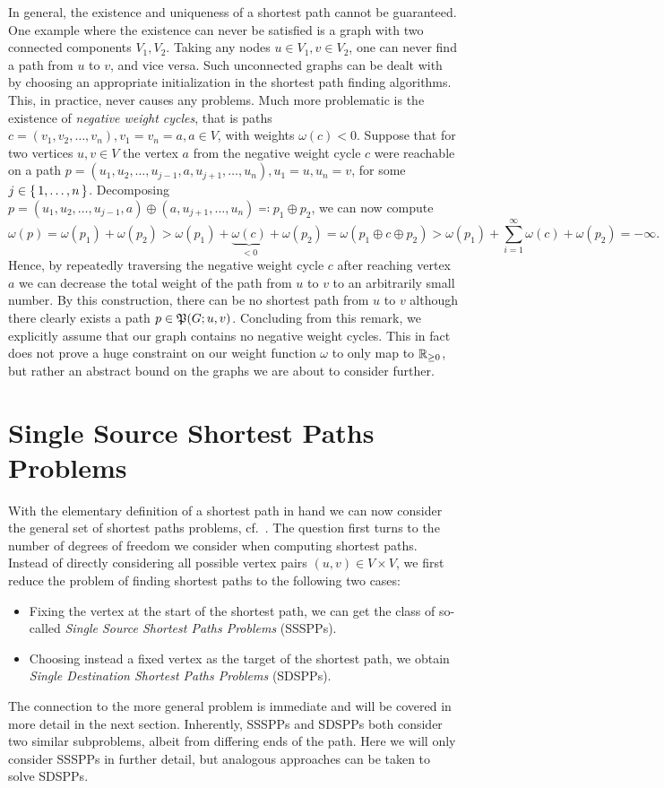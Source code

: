 In general, the existence and uniqueness of a shortest path cannot be guaranteed.
One example where the existence can never be satisfied is a graph with two connected components $V_1, V_2$.
Taking any nodes $u \in V_1, v \in V_2$, one can never find a path from $u$ to $v$, and vice versa.
Such unconnected graphs can be dealt with by choosing an appropriate initialization in the shortest path finding algorithms.
This, in practice, never causes any problems.
Much more problematic is the existence of \emph{negative weight cycles}, that is paths $c = (v_1, v_2, \dots, v_n), v_1 = v_n = a, a \in V$, with weights $\omega(c) < 0$.
Suppose that for two vertices $u, v \in V$ the vertex $a$ from the negative weight cycle $c$ were reachable on a path $p = (u_1, u_2, \dots, u_{j - 1}, a, u_{j + 1}, \dots, u_n), u_1 = u, u_n = v$, for some $j \in \left\{\,1, \dots, n\,\right\}$.
Decomposing $p = (u_1, u_2, \dots, u_{j - 1}, a) \oplus (a, u_{j + 1}, \dots, u_n) \eqqcolon p_1 \oplus p_2$, we can now compute
\[
    \omega(p) = \omega(p_1) + \omega(p_2) > \omega(p_1) + \underbrace{\omega(c)}_{< 0} + \omega(p_2) = \omega(p_1 \oplus c \oplus p_2) > \omega(p_1) + \sum\limits_{i = 1}^\infty \omega(c) + \omega(p_2) = -\infty.
\]
Hence, by repeatedly traversing the negative weight cycle $c$ after reaching vertex $a$ we can decrease the total weight of the path from $u$ to $v$ to an arbitrarily small number.
By this construction, there can be no shortest path from $u$ to $v$ although there clearly exists a path $p \in \mathfrak{P}(G; u, v)$.
Concluding from this remark, we explicitly assume that our graph contains no negative weight cycles.
This in fact does not prove a huge constraint on our weight function $\omega$ to only map to $\mathbb{R}_{\ge 0}$, but rather an abstract bound on the graphs we are about to consider further.

\section{Single Source Shortest Paths Problems}

With the elementary definition of a shortest path in hand we can now consider the general set of shortest paths problems, cf.~\cite[Chapter~24]{Cormen2001}.
The question first turns to the number of degrees of freedom we consider when computing shortest paths.
Instead of directly considering all possible vertex pairs $(u, v) \in V \times V$, we first reduce the problem of finding shortest paths to the following two cases:
\begin{itemize}
    \item Fixing the vertex at the start of the shortest path, we can get the class of so-called \emph{Single Source Shortest Paths Problems} (SSSPPs).
    \item Choosing instead a fixed vertex as the target of the shortest path, we obtain \emph{Single Destination Shortest Paths Problems} (SDSPPs).
\end{itemize}
The connection to the more general problem is immediate and will be covered in more detail in the next section.
Inherently, SSSPPs and SDSPPs both consider two similar subproblems, albeit from differing ends of the path.
Here we will only consider SSSPPs in further detail, but analogous approaches can be taken to solve SDSPPs.

